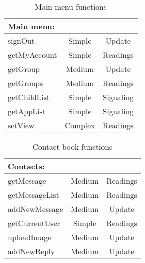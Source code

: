 \begin{table}[!ht]
\centering
\begin{tabular}{ l  c  c }

Main menu: & & \\ \hline
signOut & Simple & Update \\ \hline
getMyAccount & Simple & Readings \\ \hline
getGroup & Medium & Update \\ \hline
getGroups & Medium & Readings \\ \hline
getChildList & Simple & Signaling \\ \hline
getAppList & Simple & Signaling \\ \hline
setView & Complex & Readings \\ \hline

\end{tabular}
\caption{Main menu functions}
\label{tbl:mainmenu}
\end{table}

\begin{table}[!ht]
\centering
\begin{tabular}{ l  c  c }

Contacts: & & \\ \hline
getMessage & Medium & Readings \\ \hline
getMessageList & Medium & Readings \\ \hline
addNewMessage & Medium & Update \\ \hline
getCurrentUser & Simple & Readings \\ \hline
uploadImage & Medium & Update \\ \hline
addNewReply & Medium & Update \\ \hline

\end{tabular}
\caption{Contact book functions}
\label{tbl:contactbook}
\end{table}

